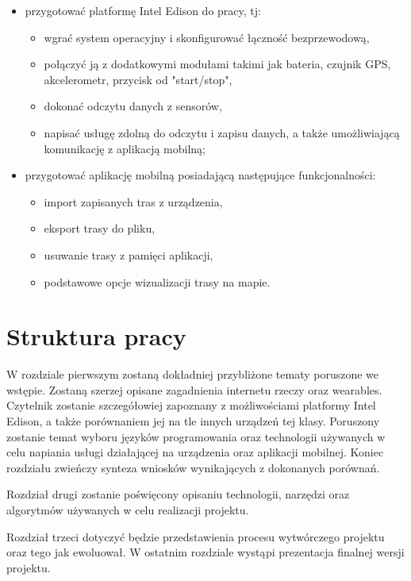 \documentclass[a4paper,twoside,titlepage,openright]{book}
\begin{document}
\begin{itemize}
\item przygotować platformę Intel Edison do pracy, tj:
	\begin{itemize} 
		\item wgrać system operacyjny i skonfigurować łączność bezprzewodową,
		\item połączyć ją z dodatkowymi modułami takimi jak bateria, czujnik GPS, akcelerometr, przycisk od "start/stop",
		\item dokonać odczytu danych z sensorów,
		\item napisać usługę zdolną do odczytu i zapisu danych, a także umożliwiającą komunikację z aplikacją mobilną;
	\end{itemize}
\item przygotować aplikację mobilną posiadającą następujące funkcjonalności:
	\begin{itemize}
		\item import zapisanych tras z urządzenia,
		\item eksport trasy do pliku,
		\item usuwanie trasy z pamięci aplikacji,
		\item podstawowe opcje wizualizacji trasy na mapie.
	\end{itemize}
\end{itemize}

\section*{Struktura pracy}

W rozdziale pierwszym zostaną dokładniej przybliżone tematy poruszone we wstępie. Zostaną szerzej opisane zagadnienia internetu rzeczy oraz wearables. Czytelnik zostanie szczegółowiej zapoznany z możliwościami platformy Intel Edison, a także porównaniem jej na tle innych urządzeń tej klasy. Poruszony zostanie temat wyboru języków programowania oraz technologii używanych w celu napiania usługi działającej na urządzenia oraz aplikacji mobilnej. Koniec rozdziału zwieńczy synteza wniosków wynikających z dokonanych porównań.

Rozdział drugi zostanie poświęcony opisaniu technologii, narzędzi oraz algorytmów używanych w celu realizacji projektu. 

Rozdział trzeci dotyczyć będzie przedstawienia procesu wytwórczego projektu oraz tego jak ewoluował. W ostatnim rozdziale wystąpi prezentacja finalnej wersji projektu.
\end{document}
